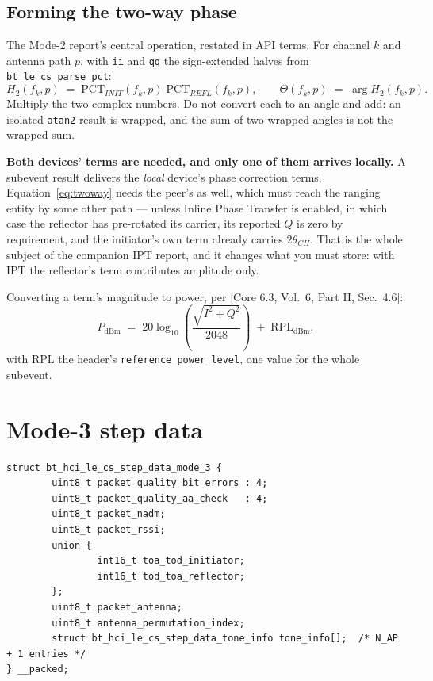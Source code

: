 \documentclass[11pt,a4paper]{article}
\newcommand{\code}[1]{\texttt{\small #1}}
\newcommand{\PCT}{\ensuremath{\mathrm{PCT}}}
\newcommand{\RPL}{\ensuremath{\mathrm{RPL}}}
\newcommand{\IPT}{\ensuremath{\mathrm{IPT}}}
\newcommand{\core}[1]{\textcolor{rulegrey}{\small[Core 6.3, #1]}}
\begin{document}
\subsection{Forming the two-way phase}

The Mode-2 report's central operation, restated in API terms. For channel $k$ and antenna path $p$,
with \code{ii} and \code{qq} the sign-extended halves from \code{bt\_\allowbreak{}le\_\allowbreak{}cs\_\allowbreak{}parse\_\allowbreak{}pct}:
\begin{equation}
H_2(f_k,p) \;=\; \PCT_{INIT}(f_k,p)\;\PCT_{REFL}(f_k,p),
\qquad
\Theta(f_k,p) \;=\; \arg H_2(f_k,p) .
\label{eq:twoway}
\end{equation}
Multiply the two complex numbers. Do not convert each to an angle and add: an isolated
\code{atan2} result is wrapped, and the sum of two wrapped angles is not the wrapped sum.

\begin{callout}
\textbf{Both devices' terms are needed, and only one of them arrives locally.} A subevent result
delivers the \emph{local} device's phase correction terms. Equation~\eqref{eq:twoway} needs the
peer's as well, which must reach the ranging entity by some other path --- unless Inline Phase
Transfer is enabled, in which case the reflector has pre-rotated its carrier, its reported $Q$ is
zero by requirement, and the initiator's own term already carries $2\theta_{CH}$. That is the whole
subject of the companion \IPT{} report, and it changes what you must store: with \IPT{} the
reflector's term contributes amplitude only.
\end{callout}

Converting a term's magnitude to power, per \core{Vol.\ 6, Part H, Sec.\ 4.6}:
\begin{equation}
P_{\mathrm{dBm}} \;=\; 20\log_{10}\!\left(\frac{\sqrt{I^2+Q^2}}{2048}\right) \;+\; \RPL_{\mathrm{dBm}} ,
\label{eq:rpl}
\end{equation}
with $\RPL$ the header's \code{reference\_\allowbreak{}power\_\allowbreak{}level}, one value for the whole subevent.

\section{Mode-3 step data}
\label{sec:mode3}

\begin{lstlisting}
struct bt_hci_le_cs_step_data_mode_3 {
        uint8_t packet_quality_bit_errors : 4;
        uint8_t packet_quality_aa_check   : 4;
        uint8_t packet_nadm;
        uint8_t packet_rssi;
        union {
                int16_t toa_tod_initiator;
                int16_t tod_toa_reflector;
        };
        uint8_t packet_antenna;
        uint8_t antenna_permutation_index;
        struct bt_hci_le_cs_step_data_tone_info tone_info[];  /* N_AP + 1 entries */
} __packed;
\end{lstlisting}
\end{document}
